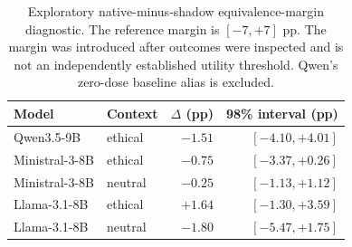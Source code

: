 \begin{table}[H]
\centering\small\setlength{\tabcolsep}{4pt}
\begin{tabular}{llrr}
\toprule
Model & Context & $\Delta$ (pp) & 98\% interval (pp) \\
\midrule
Qwen3.5-9B & ethical & $-1.51$ & $[-4.10, +4.01]$ \\
Ministral-3-8B & ethical & $-0.75$ & $[-3.37, +0.26]$ \\
Ministral-3-8B & neutral & $-0.25$ & $[-1.13, +1.12]$ \\
Llama-3.1-8B & ethical & $+1.64$ & $[-1.30, +3.59]$ \\
Llama-3.1-8B & neutral & $-1.80$ & $[-5.47, +1.75]$ \\
\bottomrule
\end{tabular}
\caption{Exploratory native-minus-shadow equivalence-margin diagnostic. The reference margin is $[-7,+7]$ pp. The margin was introduced after
outcomes were inspected and is not an independently established utility
threshold. Qwen's zero-dose baseline alias is excluded.}
\label{tab:equivalence-margin}
\end{table}
